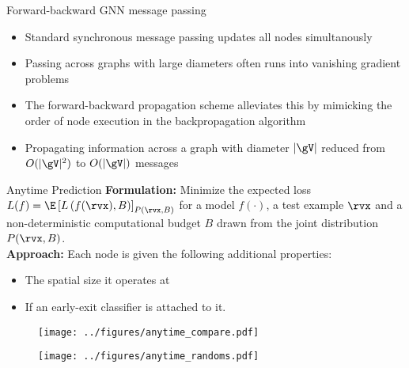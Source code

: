 \documentclass[final,t]{beamer}
\begin{document}
\begin{frame}{}
\begin{columns}[t]
\begin{column}{.47\linewidth}
\begin{exampleblock}{Forward-backward GNN message passing}
 	\begin{itemize}
 		\item Standard synchronous message passing updates all nodes simultanously
 		\item Passing across graphs with large diameters often runs into vanishing gradient problems
 		\item The forward-backward propagation scheme alleviates this by mimicking the order of node execution in the backpropagation algorithm
		\item Propagating information across a graph with diameter $|\gV|$ reduced from  $O(|\gV|^2)$ to $O(|\gV|)$ messages
 	\end{itemize}
    \end{exampleblock}
    
    
    
	  \begin{exampleblock}{Anytime Prediction}
	  \textbf{Formulation:} Minimize the expected loss 
$L(f) = \E\left[ L\left( f(\rvx), B \right)\right]_{P(\rvx, B)}$
for a model $f(\cdot)$, a test example $\rvx$ and a non-deterministic computational budget $B$
drawn from the joint distribution $P(\rvx, B)$. 
	\\
	\vspace{1cm}
	\textbf{Approach:} Each node is given the following additional properties: 
	\begin{itemize}
		\item The spatial size it operates at
		\item If an early-exit classifier is attached to it.
	\end{itemize}	
		  \vspace{0.4cm}
	\begin{figure}[t]
	\centering
	\begin{minipage}{.48\textwidth}
	  \centering
	  \texttt{[image: ../figures/anytime\_compare.pdf]}
	\label{table:Results4}
	  \label{fig:test1}
	\end{minipage}%
	\begin{minipage}{.48\textwidth}
	  \centering
	  \texttt{[image: ../figures/anytime\_randoms.pdf]}
	  \label{fig:test2}
	\end{minipage}
	\end{figure}
	 \vspace{0.32cm}


\end{exampleblock}
\end{column}
\end{columns}
\end{frame}
\end{document}
